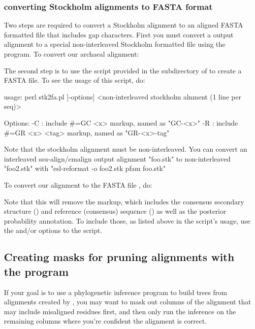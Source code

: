\subsubsection{converting Stockholm alignments to FASTA format}

Two steps are required to convert a Stockholm alignment to an aligned
FASTA formatted file that includes gap characters. First you must
convert a  output alignment to a special
non-interleaved Stockholm formatted file using the
 program. To convert our archaeal alignment:


The second step is to use the  script 
provided in the  subdirectory of 
to create a FASTA file. To see the usage of this script, do:

\begin{sreoutput}
usage: perl stk2fa.pl [-options] <non-interleaved stockholm alnment (1 line per seq)>

Options:
	-C : include #=GC <x> markup, named as "GC-<x>"
	-R : include #=GR <x> <tag> markup, named as "GR-<x>-tag"

Note that the stockholm alignment must be non-interleaved.
You can convert an interleaved ssu-align/cmalign output alignment "foo.stk"
to non-interleaved "foo2.stk" with "esl-reformat -o foo2.stk pfam foo.stk"
\end{sreoutput}

To convert our  alignment to the FASTA file
, do:


Note that this will remove the  markup, which includes the
consensus secondary structure () and reference
(consensus) sequence () as well as the posterior
probability annotation. To include those, as listed above in the
script's usage, use the  and/or  options to the
script.

\subsection{Creating masks for pruning alignments with the
   program}

If your goal is to use a phylogenetic inference program to build trees
from alignments created by , you may want to mask
out columns of the alignment that may include misaligned residues
first, and then only run the inference on the remaining columns where
you're confident the alignment is correct. 

